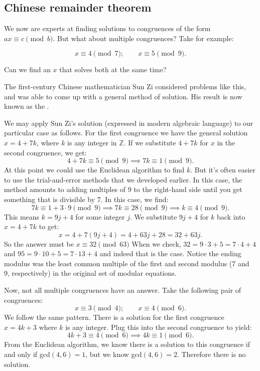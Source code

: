 \subsection{Chinese remainder theorem}
We now are experts at finding solutions to congruences  of the form $ax \equiv c \pmod b$. But what about multiple congruences?  Take for example:

\[x \equiv 4 \pmod 7; \qquad x \equiv 5 \pmod 9.\]

Can we find  an $x$ that solves both at the same time? 

The first-century Chinese mathematician Sun Zi considered problems like this, and was able to come up with a general method of solution. His result is now known as the .  

We may apply Sun Zi's solution (expressed in modern algebraic language) to our particular case as follows. For the first congruence we have the general solution $x=4+7k$, where $k$ is any integer in $\mathbb{Z}$.  If we  substitute $4+7k$ for $x$ in the second congruence, we get:
\[4+7k \equiv 5 \pmod 9 \implies 7k \equiv 1 \pmod 9.\]
At this point we could use the Euclidean algorithm to find $k$. But it's often easier to use the trial-and-error methods that we developed earlier. In this case, the method amounts to adding multiples of 9 to the right-hand side until you get something that is divisible by 7.  In this case, we find:
\[7k \equiv 1 + 3\cdot 9 \pmod 9 \implies 7k \equiv 28 \pmod 9 \implies k \equiv 4 \pmod 9.\]
This means $k = 9j + 4$ for some integer $j$.  We substitute $9j + 4$ for $k$ back into $x=4+7k$ to get:
\[x = 4 + 7(9j + 4) = 4 + 63j + 28 = 32 + 63j.\]
So the answer must be $x \equiv 32 \pmod {63}$  When we check, $32 = 9 \cdot 3 + 5 = 7 \cdot 4 + 4$ and $95 = 9 \cdot 10 + 5 = 7 \cdot 13 + 4$ and indeed that is the case.  Notice the ending modulus was the least common multiple of the first and second modulus (7 and  9, respectively) in the original set of modular equations.


Now, not all multiple congruences have an answer.  Take the following pair of congruences:
\[x \equiv 3 \pmod 4; \qquad x \equiv 4 \pmod 6.\]
We follow the same pattern.  There is a solution for the first congruence $x = 4k + 3$ where $k$ is any integer.  Plug this into the second congruence to yield:
\[4k + 3 \equiv 4 \pmod 6 \implies 4k \equiv 1 \pmod 6.\]
From the Euclidean algorithm, we know there is a solution to this congruence if and only if gcd$(4,6) = 1$, but we know gcd$(4,6) = 2$.  Therefore there is no solution.  


